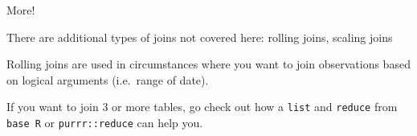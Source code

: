 \documentclass[ignorenonframetext,]{beamer}
\begin{document}
\begin{frame}[fragile]{More!}

There are additional types of joins not covered here: rolling joins,
scaling joins

Rolling joins are used in circumstances where you want to join
observations based on logical arguments (i.e.~range of date).

If you want to join 3 or more tables, go check out how a \texttt{list}
and \texttt{reduce} from \texttt{base\ R} or \texttt{purrr::reduce} can
help you.

\end{frame}
\end{document}

